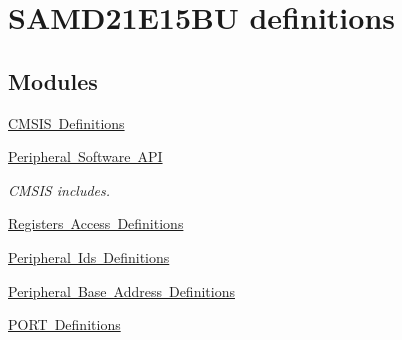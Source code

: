 \hypertarget{group___s_a_m_d21_e15_b_u__definitions}{}\section{S\+A\+M\+D21\+E15\+BU definitions}
\label{group___s_a_m_d21_e15_b_u__definitions}
\subsection*{Modules}
\begin{DoxyCompactItemize}
\item 
\mbox{\hyperlink{group___s_a_m_d21_e15_b_u__cmsis}{C\+M\+S\+I\+S Definitions}}
\item 
\mbox{\hyperlink{group___s_a_m_d21_e15_b_u__api}{Peripheral Software A\+PI}}
\begin{DoxyCompactList}\small\item\em C\+M\+S\+IS includes. \end{DoxyCompactList}\item 
\mbox{\hyperlink{group___s_a_m_d21_e15_b_u__reg}{Registers Access Definitions}}
\item 
\mbox{\hyperlink{group___s_a_m_d21_e15_b_u__id}{Peripheral Ids Definitions}}
\item 
\mbox{\hyperlink{group___s_a_m_d21_e15_b_u__base}{Peripheral Base Address Definitions}}
\item 
\mbox{\hyperlink{group___s_a_m_d21_e15_b_u__port}{P\+O\+R\+T Definitions}}
\end{DoxyCompactItemize}

